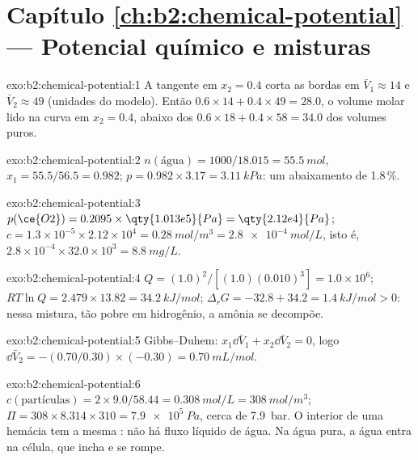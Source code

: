 \section*{Capítulo \ref{ch:b2:chemical-potential} --- Potencial químico e misturas}

\begin{solution}{exo:b2:chemical-potential:1}
A tangente em $x_2 = 0.4$ corta as bordas em $\bar V_1 \approx 14$ e $\bar
V_2 \approx 49$ (unidades do modelo). Então $0.6 \times 14 + 0.4 \times 49 = 28.0$,
o volume molar lido na curva em $x_2 = 0.4$, abaixo dos
$0.6 \times 18 + 0.4 \times 58 = 34.0$ dos volumes puros.
\end{solution}

\begin{solution}{exo:b2:chemical-potential:2}
$n(\text{água}) = 1000/18.015 = \qty{55.5}{mol}$, $x_1 = 55.5/56.5 = 0.982$;
$p = 0.982 \times 3.17 = \qty{3.11}{kPa}$: um abaixamento de 1.8\,\%.
\end{solution}

\begin{solution}{exo:b2:chemical-potential:3}
$p(\ce{O2}) = 0.2095 \times \qty{1.013e5}{Pa} = \qty{2.12e4}{Pa}$;
$c = 1.3 \times 10^{-5} \times 2.12 \times 10^4 = \qty{0.28}{mol/m^3} =
\qty{2.8e-4}{mol/L}$, isto é, $2.8 \times 10^{-4} \times 32.0 \times 10^3 =
\qty{8.8}{mg/L}$.
\end{solution}

\begin{solution}{exo:b2:chemical-potential:4}
$Q = (1.0)^2/[(1.0)(0.010)^3] = 1.0 \times 10^6$; $RT\ln Q = 2.479 \times 13.82 =
\qty{34.2}{kJ/mol}$; $\Delta_r G = -32.8 + 34.2 = \qty{+1.4}{kJ/mol} > 0$: nessa
mistura, tão pobre em hidrogênio, a amônia se decompõe.
\end{solution}

\begin{solution}{exo:b2:chemical-potential:5}
Gibbs--Duhem: $x_1\dd\bar V_1 + x_2\dd\bar V_2 = 0$, logo $\dd\bar V_2 =
-(0.70/0.30) \times (-0.30) = \qty{+0.70}{mL/mol}$.
\end{solution}

\begin{solution}{exo:b2:chemical-potential:6}
$c(\text{partículas}) = 2 \times 9.0/58.44 = \qty{0.308}{mol/L} =
\qty{308}{mol/m^3}$; $\Pi = 308 \times 8.314 \times 310 = \qty{7.9e5}{Pa}$,
cerca de \qty{7.9}{bar}. O interior de uma hemácia tem a mesma : não há fluxo líquido de água. Na água pura, a água entra na
célula, que incha e se rompe.
\end{solution}


